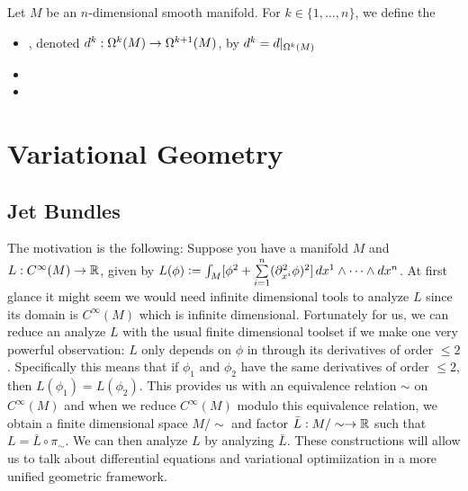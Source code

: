 \documentclass{book}
\begin{document}
\begin{defn}
	Let $M$ be an $n$-dimensional smooth manifold. For $k \in  \{1, \ldots, n\}$, we define the
	\begin{itemize}
		 \item {}, denoted $d^k: \Omega^k(M) \rightarrow \Omega^{k+1}(M)$, by $d^k = d|_{\Omega^k(M)}$
		 \item 
		 \item 
	\end{itemize} 
\end{defn}
































\part{Variational Geometry}
\chapter{Jet Bundles}

\begin{note}
	The motivation is the following: Suppose you have a manifold $M$ and $L:C^{\infty}(M) \rightarrow \mathbb{R}$, given by $L(\phi) \vcentcolon= \int_M [\phi^2 + \sum\limits_{i=1}^n (\partial^2_{x^i} \phi)^2] \,d x^1 \wedge \cdots \wedge dx^n$. At first glance it might seem we would need infinite dimensional tools to analyze $L$ since its domain is $C^{\infty}(M)$ which is infinite dimensional. Fortunately for us, we can reduce an analyze $L$ with the usual finite dimensional toolset if we make one very powerful observation: $L$ only depends on $\phi$ in through its derivatives of order $\leq 2$. Specifically this means that if $\phi_1$ and $\phi_2$ have the same derivatives of order $\leq 2$, then $L(\phi_1) = L(\phi_2)$. This provides us with an equivalence relation $\sim$ on $C^{\infty}(M)$ and when we reduce $C^{\infty}(M)$ modulo this equivalence relation, we obtain a finite dimensional space $ M / \sim$ and factor $\bar{L}: M / \sim \rightarrow \mathbb{R}$ such that $L = \bar{L} \circ \pi_{\sim}$. We can then analyze $L$ by analyzing $\bar{L}$. These constructions will allow us to talk about differential equations and variational optimiization in a more unified geometric framework.
\end{note}
\end{document}
